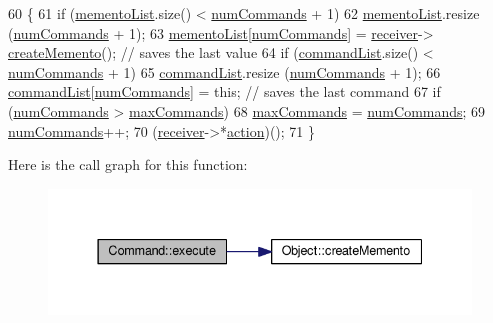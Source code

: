 \begin{DoxyCode}
60                                \{
61             \textcolor{keywordflow}{if} (\hyperlink{classCommand_a03c855537275970db8e4b9c7ea64a9f9}{mementoList}.size() < \hyperlink{classCommand_a661b9cfc157529504ecf44528e4640b6}{numCommands} + 1)
62                 \hyperlink{classCommand_a03c855537275970db8e4b9c7ea64a9f9}{mementoList}.resize (\hyperlink{classCommand_a661b9cfc157529504ecf44528e4640b6}{numCommands} + 1);
63             \hyperlink{classCommand_a03c855537275970db8e4b9c7ea64a9f9}{mementoList}[\hyperlink{classCommand_a661b9cfc157529504ecf44528e4640b6}{numCommands}] = \hyperlink{classCommand_ac4a7e0c82bede3a8cd2f2b1478bd4763}{receiver}->
      \hyperlink{classObject_a169528dfd6ff33b21b038da8021cd748}{createMemento}();  \textcolor{comment}{// saves the last value}
64             \textcolor{keywordflow}{if} (\hyperlink{classCommand_a3b694e6c1b5a3e62bdc0d7d1b3178eb1}{commandList}.size() < \hyperlink{classCommand_a661b9cfc157529504ecf44528e4640b6}{numCommands} + 1)
65                 \hyperlink{classCommand_a3b694e6c1b5a3e62bdc0d7d1b3178eb1}{commandList}.resize (\hyperlink{classCommand_a661b9cfc157529504ecf44528e4640b6}{numCommands} + 1);
66             \hyperlink{classCommand_a3b694e6c1b5a3e62bdc0d7d1b3178eb1}{commandList}[\hyperlink{classCommand_a661b9cfc157529504ecf44528e4640b6}{numCommands}] = \textcolor{keyword}{this};  \textcolor{comment}{// saves the last command}
67             \textcolor{keywordflow}{if} (\hyperlink{classCommand_a661b9cfc157529504ecf44528e4640b6}{numCommands} > \hyperlink{classCommand_a06f1310ccbfdcfd18cfae03dcb428728}{maxCommands})
68                 \hyperlink{classCommand_a06f1310ccbfdcfd18cfae03dcb428728}{maxCommands} = \hyperlink{classCommand_a661b9cfc157529504ecf44528e4640b6}{numCommands};
69             \hyperlink{classCommand_a661b9cfc157529504ecf44528e4640b6}{numCommands}++;
70             (\hyperlink{classCommand_ac4a7e0c82bede3a8cd2f2b1478bd4763}{receiver}->*\hyperlink{classCommand_ac5473faf8b8b03ce83353838bc00c6dd}{action})();
71         \}
\end{DoxyCode}


Here is the call graph for this function\+:
\nopagebreak
\begin{figure}[H]
\begin{center}
\leavevmode
\includegraphics[width=337pt]{classCommand_a1f73a16e8706aec4c4db746f710b88d9_cgraph}
\end{center}
\end{figure}


